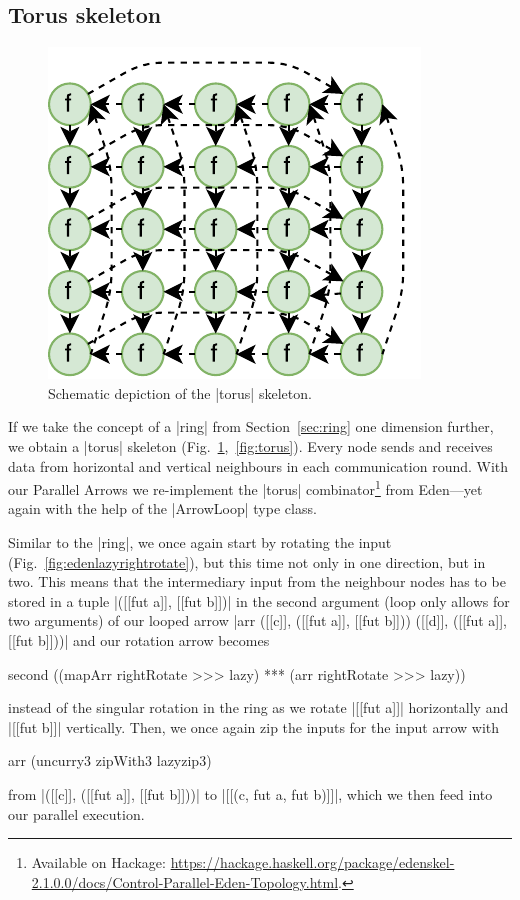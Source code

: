 \subsection{Torus skeleton}\label{sec:torus}
\begin{figure}
	\includegraphics[scale=0.75]{images/torus}
	\caption{Schematic depiction of the |torus| skeleton.}
	\label{fig:ringTorusImg}
\end{figure}
If we take the concept of a |ring| from Section~\ref{sec:ring} one dimension further, we obtain a |torus| skeleton (Fig.~\ref{fig:ringTorusImg},~\ref{fig:torus}). Every node sends and receives data from horizontal and vertical neighbours in each communication round.
With our Parallel Arrows we re-implement the |torus| combinator\footnote{Available on Hackage: \url{https://hackage.haskell.org/package/edenskel-2.1.0.0/docs/Control-Parallel-Eden-Topology.html}.} from Eden---yet again with the help of the |ArrowLoop| type class.

Similar to the |ring|, we once again start by rotating the input (Fig.~\ref{fig:edenlazyrightrotate}), but this time not only in one direction, but in two. This means that the intermediary input from the neighbour nodes has to be stored in a tuple |([[fut a]], [[fut b]])| in the second argument (loop only allows for two arguments) of our looped arrow |arr ([[c]], ([[fut a]], [[fut b]])) ([[d]], ([[fut a]], [[fut b]]))| and our rotation arrow becomes 
\begin{code}
second ((mapArr rightRotate >>> lazy) *** (arr rightRotate >>> lazy))
\end{code}
instead of the singular rotation in the ring as we rotate |[[fut a]]| horizontally and |[[fut b]]| vertically. Then, we once again zip the inputs for the input arrow with 
\begin{code}
arr (uncurry3 zipWith3 lazyzip3)
\end{code}
from |([[c]], ([[fut a]], [[fut b]]))| to |[[(c, fut a, fut b)]]|, which we then feed into our parallel execution.

